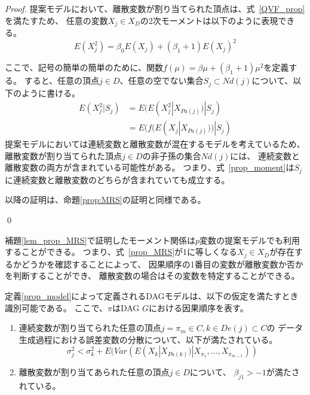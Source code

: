 \begin{proof}
  提案モデルにおいて、離散変数が割り当てられた頂点は、式~\eqref{QVF_prop}を満たすため、
  任意の変数$X_j \in X_D$の2次モーメントは以下のように表現できる。
  \begin{equation*}
    E(X_j^2) = \beta_0 E(X_j) + (\beta_1 + 1)E(X_j)^2
  \end{equation*}

  ここで、記号の簡単の簡単のために、関数$f(\mu) = \beta \mu + (\beta_1 + 1) \mu^2$を定義する。
  すると、任意の頂点$j \in D$、任意の空でない集合$S_j \subset Nd(j)$について、以下のように書ける。
  \begin{equation}
    \begin{split}
      E(X_j^2 | S_j) &= E(E(X_j^2 | X_{Pa(j)}) | S_j) \\
                     &= E(f(E(X_j | X_{Pa(j)})) | S_j)
    \end{split}
    \label{prop_moment}
  \end{equation}
  提案モデルにおいては連続変数と離散変数が混在するモデルを考えているため、
  離散変数が割り当てられた頂点$j \in D$の非子孫の集合$Nd(j)$には、
  連続変数と離散変数の両方が含まれている可能性がある。
  つまり、式~\eqref{prop_moment}は$S_j$に連続変数と離散変数のどちらが含まれていても成立する。

  以降の証明は、命題\ref{prop:MRS}の証明と同様である。

  \qed
\end{proof}

補題\ref{lem_prop_MRS}で証明したモーメント関係は$p$変数の提案モデルでも利用することができる。
つまり、式~\eqref{prop_MRS}が1に等しくなる$X_j \in X_D$が存在するかどうかを確認することによって、
因果順序の1番目の変数が離散変数か否かを判断することができ、
離散変数の場合はその変数を特定することができる。

\begin{theo}[提案モデルの識別可能性]
  \label{theo:prop_identifiability}
  定義\ref{prop_model}によって定義されるDAGモデルは、以下の仮定を満たすとき識別可能である。
  ここで、$\pi$はDAG $G$における因果順序を表す。
  \begin{enumerate}[label=(\Alph*)]
    \item
    連続変数が割り当てられた任意の頂点$j = \pi_m \in C, k \in De(j) \subset C$の
    データ生成過程における誤差変数の分散について、以下が満たされている。
    \begin{equation*}
      \sigma_j^2 < \sigma_k^2 + E(\mathit{Var}(E(X_k | X_{Pa(k)}) | X_{\pi_1}, \dots, X_{\pi_{m-1}}))
    \end{equation*}

    \item
    離散変数が割り当てあられた任意の頂点$j \in D$について、
    $\beta_{j1} > -1$が満たされている。
  \end{enumerate}
\end{theo}

